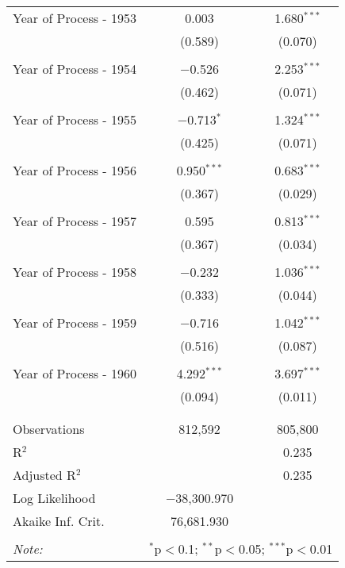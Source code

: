 \begin{table}[!htbp]
\begin{tabular}{@{\extracolsep{5pt}}lcc}
 Year of Process - 1953 & 0.003 & 1.680$^{***}$ \\ 
  & (0.589) & (0.070) \\ 
  & & \\ 
 Year of Process - 1954 & $-$0.526 & 2.253$^{***}$ \\ 
  & (0.462) & (0.071) \\ 
  & & \\ 
 Year of Process - 1955 & $-$0.713$^{*}$ & 1.324$^{***}$ \\ 
  & (0.425) & (0.071) \\ 
  & & \\ 
 Year of Process - 1956 & 0.950$^{***}$ & 0.683$^{***}$ \\ 
  & (0.367) & (0.029) \\ 
  & & \\ 
 Year of Process - 1957 & 0.595 & 0.813$^{***}$ \\ 
  & (0.367) & (0.034) \\ 
  & & \\ 
 Year of Process - 1958 & $-$0.232 & 1.036$^{***}$ \\ 
  & (0.333) & (0.044) \\ 
  & & \\ 
 Year of Process - 1959 & $-$0.716 & 1.042$^{***}$ \\ 
  & (0.516) & (0.087) \\ 
  & & \\ 
 Year of Process - 1960 & 4.292$^{***}$ & 3.697$^{***}$ \\ 
  & (0.094) & (0.011) \\ 
  & & \\ 
\hline \\[-1.8ex] 
Observations & 812,592 & 805,800 \\ 
R$^{2}$ &  & 0.235 \\ 
Adjusted R$^{2}$ &  & 0.235 \\ 
Log Likelihood & $-$38,300.970 &  \\ 
Akaike Inf. Crit. & 76,681.930 &  \\ 
\hline 
\hline \\[-1.8ex] 
\textit{Note:}  & \multicolumn{2}{r}{$^{*}$p$<$0.1; $^{**}$p$<$0.05; $^{***}$p$<$0.01} \\ 
\end{tabular} 
\end{table} 
